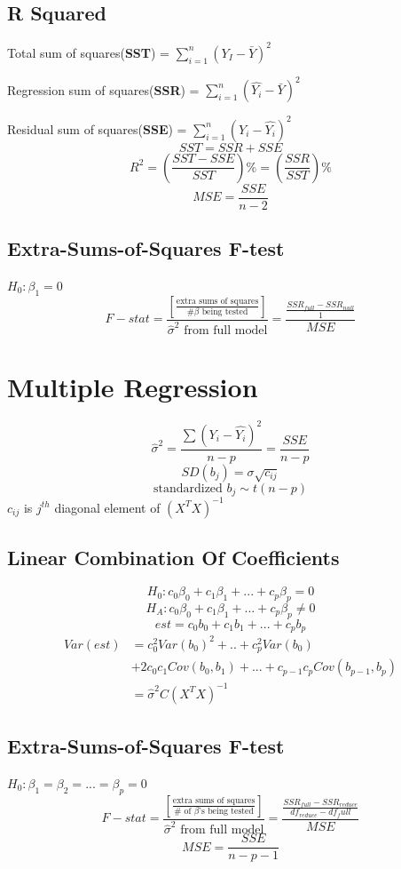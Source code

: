 \documentclass[10pt,landscape, fleqn]{article}
\begin{document}
\begin{multicols}{3}
			\subsection{R Squared}
				Total sum of squares(\textbf{SST}) = $\sum_{i=1}^{n}(Y_I-\bar{Y})^2$ \par 
				Regression sum of squares(\textbf{SSR}) = $\sum_{i=1}^{n}(\hat{Y_i}-\bar{Y})^2$ \par 
				Residual sum of squares(\textbf{SSE}) = $\sum_{i=1}^{n}(Y_i-\hat{Y_i})^2$
				\[ SST = SSR + SSE \]
				\[ R^2 = (\frac{SST-SSE}{SST})\% = (\frac{SSR}{SST})\% \]
				\[ MSE = \frac{SSE}{n-2} \]
			\subsection{Extra-Sums-of-Squares F-test}
				$H_0: \beta_1=0$
				\[F-stat = \frac{\left[ \frac{\mbox{extra sums of squares}}{\# \beta\mbox{ being tested}} \right]}{\hat{\sigma}^2\mbox{ from full model}} 
				        =\frac{\frac{SSR_{full}-SSR_{null}}{1}}{MSE}\]
				
		\section{Multiple Regression}
			\[\hat{\sigma}^2 = \frac{\sum(Y_i-\hat{Y_i})^2}{n-p} = \frac{SSE}{n-p} \]
			\[SD(b_j) = \sigma\sqrt{c_{ij}} \]
			\[\mbox{standardized } b_j \sim t(n-p) \]
			$c_{ij}$ is $j^{th}$ diagonal element of $(X^TX)^{-1}$ \par 
			\subsection{Linear Combination Of Coefficients}
				\[ H_0: c_0\beta_0 + c_1\beta_1 + ... + c_p\beta_p = 0 \]
				\[ H_A: c_0\beta_0 + c_1\beta_1 + ... + c_p\beta_p \neq 0 \]
				\[ est=c_0b_0 + c_1b_1 + ... + c_pb_p \]
				\[
					\begin{split}
						Var(est) &= c_0^2Var(b_0)^2 + .. + c_p^2Var(b_0) \\
								&  +2c_0c_1Cov(b_0, b_1)+...+c_{p-1}c_{p}Cov(b_{p-1},b_{p})  \\
						 &= \hat{\sigma}^2C(X^TX)^{-1}
					\end{split}
				\]
			\subsection{Extra-Sums-of-Squares F-test}
			$H_0: \beta_1=\beta_2=...=\beta_p=0$
			\[F-stat = \frac{\left[ \frac{\mbox{extra sums of squares}}{\#\mbox{ of }\beta\mbox{'s being tested}} \right]}{\hat{\sigma}^2\mbox{ from full model}} 
			=\frac{\frac{SSR_{full}-SSR_{reduce}}{df_{reduce}-df_full}}{MSE}\]
			\[ MSE = \frac{SSE}{n-p-1} \]

\end{multicols}
\end{document}
